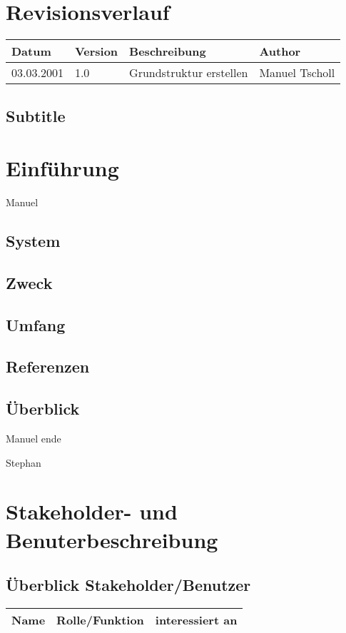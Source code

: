 \documentclass{article}
\begin{document}

\flushleft{}
\section{Revisionsverlauf}

\begin{tabular}{|l | l | l| l |}
\hline
Datum & Version & Beschreibung & Author \\ \hline
03.03.2001 & 1.0 & Grundstruktur erstellen & Manuel Tscholl \\ \hline
\end{tabular}
\subsection{Subtitle}

\section{Einführung}

Manuel
\subsection{System}
\subsection{Zweck}
\subsection{Umfang}
\subsection{Referenzen}
\subsection{Überblick}
Manuel ende

Stephan
\section{Stakeholder- und Benuterbeschreibung}
\subsection{\"Uberblick Stakeholder/Benutzer}
\begin{tabular}[]{l|l|l}
Name&Rolle/Funktion&interessiert an \\ \hline
\end{tabular}
\end{document}
